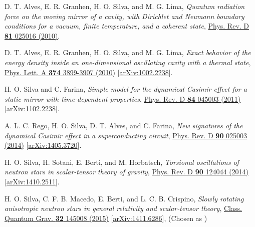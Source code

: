 \documentclass[10pt]{article}
\newcommand{\MYhref}[3][blue]{\href{#2}{\color{#1}{#3}}}
\begin{document}
\begin{bibenum}

    \item D. T. Alves, E. R. Granhen, H. O. Silva, and M. G. Lima,
    \emph{Quantum radiation force on the moving mirror of a cavity, with Dirichlet and Neumann boundary conditions for a vacuum, finite temperature, and a coherent state},
    \href{http://journals.aps.org/prd/abstract/10.1103/PhysRevD.81.025016}{Phys. Rev. D {\bf81} 025016 (2010)}.

    \item D. T. Alves, E. R. Granhen, H. O. Silva, and M. G. Lima,
    \emph{Exact behavior of the energy density inside an one-dimensional oscillating cavity with a thermal state},
    \href{http://www.sciencedirect.com/science/article/pii/S0375960110009503}{Phys. Lett. A {\bf374} 3899-3907 (2010)}
    [\href{http://arxiv.org/abs/1002.2238}{arXiv:1002.2238}].

    \item H. O. Silva and C. Farina,
    \emph{Simple model for the dynamical Casimir effect for a static mirror with time-dependent properties},
    \href{http://journals.aps.org/prd/abstract/10.1103/PhysRevD.84.045003}{Phys. Rev. D {\bf84} 045003 (2011)}
    [\href{http://arxiv.org/abs/1102.2238}{arXiv:1102.2238}].
    \label{itm:robintd}

    \item A. L. C. Rego, H. O. Silva, D. T. Alves, and C. Farina,
    \emph{New signatures of the dynamical Casimir effect in a superconducting circuit},
    \href{http://journals.aps.org/prd/abstract/10.1103/PhysRevD.90.025003}{Phys. Rev. D {\bf90} 025003 (2014)}
    [\href{http://arxiv.org/abs/1410.2511}{arXiv:1405.3720}].

    \item H. O. Silva, H. Sotani, E. Berti, and M. Horbatsch,
    \emph{Torsional oscillations of neutron stars in scalar-tensor theory of gravity},
    \href{http://journals.aps.org/prd/abstract/10.1103/PhysRevD.90.124044}{Phys. Rev. D {\bf90} 124044 (2014)}
    [\href{http://arxiv.org/abs/1410.2511}{arXiv:1410.2511}].

    \item H. O. Silva, C. F. B. Macedo, E. Berti, and L. C. B. Crispino,
    \emph{Slowly rotating anisotropic neutron stars in general relativity and scalar-tensor theory},
    \href{http://iopscience.iop.org/article/10.1088/0264-9381/32/14/145008/meta}{Class. Quantum Grav. {\bf32} 145008 (2015)}
    [\href{http://arxiv.org/abs/1411.6286}{arXiv:1411.6286}],
    (Chosen as
    \MYhref[venetianred]{http://iopscience.iop.org/collections}{\sc IOPSelect})
    \label{itm:anisostar}


\end{bibenum}
\end{document}
